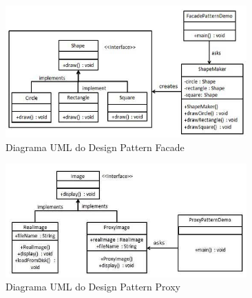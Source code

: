 \begin{figure}[H]
	\centering
	\includegraphics[width = 350px]{figuras/facade_pattern_uml_diagram}
	\caption {Diagrama UML do Design Pattern Facade}
	\label{fig:dp_facade}
\end{figure}
\begin{figure}[H]
	\centering
	\includegraphics[width = 350px]{figuras/proxy_pattern_uml_diagram}
	\caption {Diagrama UML do Design Pattern Proxy}
	\label{fig:dp_proxy}
\end{figure}


